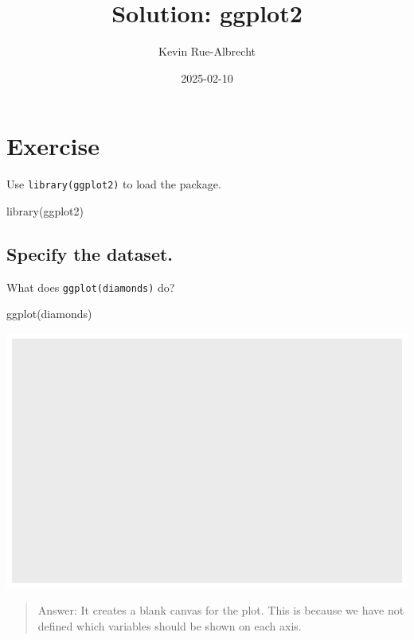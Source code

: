 \documentclass[
  letterpaper,
  DIV=11,
  numbers=noendperiod]{scrartcl}
\title{Solution: ggplot2}
\author{Kevin Rue-Albrecht}
\date{2025-02-10}
\newenvironment{Shaded}{\begin{snugshade}}{\end{snugshade}}
\newcommand{\FunctionTok}[1]{\textcolor[rgb]{0.28,0.35,0.67}{#1}}
\newcommand{\NormalTok}[1]{\textcolor[rgb]{0.00,0.23,0.31}{#1}}
\begin{document}
\maketitle


\section{Exercise}\label{exercise}

Use \texttt{library(ggplot2)} to load the package.

\begin{Shaded}
\begin{Highlighting}[]
\FunctionTok{library}\NormalTok{(ggplot2)}
\end{Highlighting}
\end{Shaded}

\subsection{Specify the dataset.}\label{specify-the-dataset.}

What does \texttt{ggplot(diamonds)} do?

\begin{Shaded}
\begin{Highlighting}[]
\FunctionTok{ggplot}\NormalTok{(diamonds)}
\end{Highlighting}
\end{Shaded}

\includegraphics{5-ggplot2_kevin_files/figure-pdf/unnamed-chunk-3-1.pdf}

\begin{quote}
Answer: It creates a blank canvas for the plot. This is because we have
not defined which variables should be shown on each axis.
\end{quote}
\end{document}
